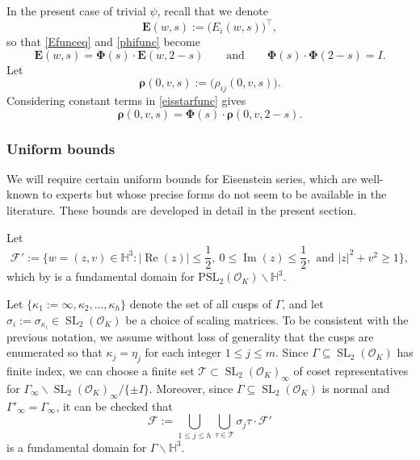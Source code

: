 \documentclass[12pt,reqno]{amsart}
\numberwithin{equation}{section}
\renewcommand{\Im}{\operatorname{Im}}
\renewcommand{\Re}{\operatorname{Re}}
\DeclareMathOperator{\SL}{SL}
\begin{document}
In the present case of trivial $\psi$, recall that we denote
\begin{equation*}
    \boldsymbol{E}(w,s):=\big(E_{i}(w,s) \big)^{\top},
\end{equation*}
so that \eqref{Efunceq} and \eqref{phifunc} become
\begin{equation} \label{eisstarfunc}
    \boldsymbol{E}(w,s)=\boldsymbol{\Phi}(s)\cdot  \boldsymbol{E}(w,2-s) \qquad \text{and} \qquad \boldsymbol{\Phi}(s) \cdot \boldsymbol{\Phi}(2-s)=I.
\end{equation}
Let
\begin{equation*}
    \boldsymbol{\rho}(0,v,s):=\big(\rho_{i j}(0,v,s) \big).
\end{equation*}
Considering constant terms in \eqref{eisstarfunc} gives 
\begin{equation} \label{rhofunc}
    \boldsymbol{\rho}(0,v,s)=\boldsymbol{\Phi}(s) \cdot \boldsymbol{\rho}(0,v,2-s).
\end{equation}

\subsubsection{Uniform bounds} 

We will require certain uniform bounds for Eisenstein series, which are well-known to experts but whose precise forms do not seem to be available in the literature. These bounds are developed in detail in the present section. 

Let
\begin{equation}\label{eq:PSL2_fund_domain}
    \mathcal{F}' := \Big\{w = (z, v) \in \mathbb{H}^3 :  |{\Re(z)}| \leq \frac{1}{2}, \ 0 \leq \Im(z) \leq \frac{1}{2}, \text{ and } |z|^2 + v^2 \geq 1 \Big\},
\end{equation}
which by \cite[\S 7.3, Proposition 3.9]{EGM} is a fundamental domain for $\mathrm{PSL}_2(\mathcal{O}_K) \backslash \mathbb{H}^3$.

Let $\{\kappa_1:=\infty, \kappa_2, \dots,\kappa_h\}$ denote the set of all cusps of $\Gamma$,
and let $\sigma_i := \sigma_{\kappa_i} \in \SL_2(\mathcal{O}_K)$ be a choice of scaling matrices. To be consistent with the previous notation, we assume without loss of generality that the cusps are enumerated so that $\kappa_j = \eta_j$ for each integer $1 \leq j \leq m$.
Since $\Gamma \subseteq \SL_2(\mathcal{O}_K)$ has finite index, we can choose a finite set $\mathcal{T} \subset \SL_2(\mathcal{O}_K)_\infty$ of coset representatives for $\Gamma_\infty \backslash \SL_2(\mathcal{O}_K)_\infty / \{\pm I \}$. Moreover, since $\Gamma \subseteq \SL_2(\mathcal{O}_K)$ is normal and $\Gamma'_\infty = \Gamma_\infty$, it can be checked that
\begin{equation}\label{eq:fund_domain_def}
    \mathcal{F} := \bigcup_{1\leq j \leq h} \bigcup_{\tau \in \mathcal{T}} \sigma_j \tau \cdot \mathcal{F}'
\end{equation}
is a fundamental domain for $\Gamma \backslash \mathbb{H}^3$.
\end{document}
